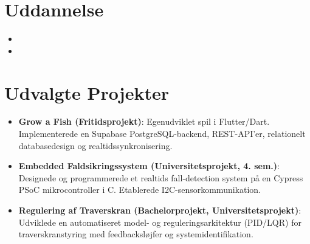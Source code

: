 \documentclass[11pt,a4paper,sans]{moderncv}
\begin{document}
\section{Uddannelse}
\vspace{1pt}
\begin{itemize}

\item{}

\vspace{3pt}

\item{}

\end{itemize}


\section{Udvalgte Projekter}
\vspace{1pt}
\begin{itemize}

\item{\textbf{Grow a Fish (Fritidsprojekt)}: Egenudviklet spil i Flutter/Dart. Implementerede en Supabase PostgreSQL-backend, REST-API'er, relationelt databasedesign og realtidssynkronisering.}

\item{\textbf{Embedded Faldsikringssystem (Universitetsprojekt, 4. sem.)}: Designede og programmerede et realtids fall-detection system på en Cypress PSoC mikrocontroller i C. Etablerede I2C-sensorkommunikation.}

\item{\textbf{Regulering af Traverskran (Bachelorprojekt, Universitetsprojekt)}: Udviklede en automatiseret model- og reguleringsarkitektur (PID/LQR) for traverskranstyring med feedbacksløjfer og systemidentifikation.}

\end{itemize}
\end{document}
